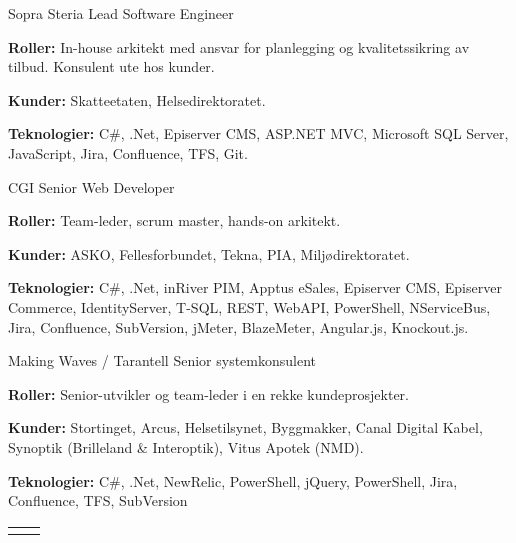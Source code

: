 \documentclass[10pt]{article} %
\begin{document}
\begin{paracol}{2}
{}
{Sopra Steria} 
{Lead Software Engineer} 
{\textbf{Roller:} In-house arkitekt med ansvar for planlegging og kvalitetssikring av tilbud. Konsulent ute hos kunder.

\textbf{Kunder:} Skatteetaten, Helsedirektoratet.

\textbf{Teknologier:} C\#, .Net, Episerver CMS, ASP.NET MVC, Microsoft SQL Server, JavaScript, Jira, Confluence, TFS, Git.
} 

{}
{CGI} 
{Senior Web Developer} 
{\textbf{Roller:} Team-leder, scrum master, hands-on arkitekt.

\textbf{Kunder:} ASKO, Fellesforbundet, Tekna, PIA, Miljødirektoratet.

\textbf{Teknologier:} C\#, .Net, inRiver PIM, Apptus eSales, Episerver CMS, Episerver Commerce, IdentityServer, T-SQL, REST, WebAPI, PowerShell, NServiceBus, Jira, Confluence, SubVersion, jMeter, BlazeMeter, Angular.js, Knockout.js.
} 

{}
{Making Waves / Tarantell} 
{Senior systemkonsulent} 
{\textbf{Roller:} Senior-utvikler og team-leder i en rekke kundeprosjekter. 

\textbf{Kunder:} Stortinget, Arcus, Helsetilsynet, Byggmakker, Canal Digital Kabel, Synoptik (Brilleland \& Interoptik), Vitus Apotek (NMD).

\textbf{Teknologier:} C\#, .Net, NewRelic, PowerShell, jQuery, PowerShell, Jira, Confluence, TFS, SubVersion
}
 

\begin{supertabular}{rl} %
\end{supertabular}

\vspace{-\baselineskip}\medskip %
\switchcolumn %


\end{paracol}
\end{document}
